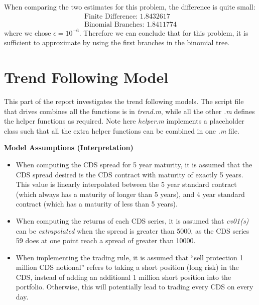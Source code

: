 \documentclass[11pt]{article}
\theoremstyle{definition}
\begin{document}
When comparing the two estimates for this problem, 
the difference is quite small:
%
\begin{equation*}
\begin{aligned}
  \text{Finite Difference: } 1.8432617 \\
  \text{Binomial Branches: } 1.8411774
\end{aligned}
\end{equation*}
%
where we chose $\epsilon = 10^{-6}$. 
Therefore we can conclude that for this problem, 
it is sufficient to approximate by 
using the first branches in the binomial tree.















\pagebreak
\section{Trend Following Model}

This part of the report investigates the trend following models.
The script file that drives combines all the functions is in
\emph{trend.m}, while all the other \emph{.m} defines 
the helper functions as required.
Note here \emph{helper.m} implements a placeholder class
such that all the extra helper functions can be 
combined in one \emph{.m} file.

\vspace{5mm}
\noindent
\textbf{Model Assumptions (Interpretation)}

\begin{itemize}
  \item When computing the CDS spread for 5 year maturity,
    it is assumed that the CDS spread desired is 
    the CDS contract with maturity of exactly 5 years.
    This value is linearly interpolated between
    the 5 year standard contract (which always has a maturity 
    of longer than 5 years), and 4 year standard contract 
    (which has a maturity of less than 5 years).
  \item When computing the returns of each CDS series,
    it is assumed that \emph{cv01(s)} can be \emph{extrapolated} 
    when the spread is greater than 5000,
    as the CDS series 59 does at one point reach a 
    spread of greater than 10000.
  \item When implementing the trading rule,
    it is assumed that ``sell protection 1 million CDS notional'' 
    refers to taking a short position (long risk) in the CDS, 
    instead of adding an additional 1 million short position 
    into the portfolio. 
    Otherwise, this will potentially lead to 
    trading every CDS on every day.
\end{itemize}
\end{document}
